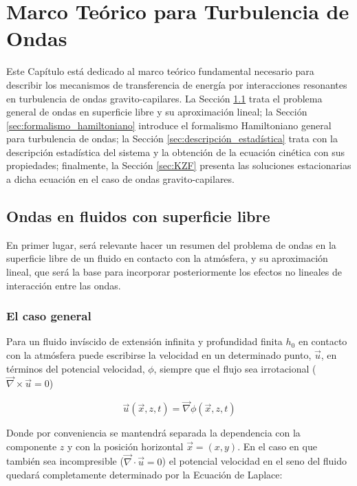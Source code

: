 \chapter{Marco Teórico para Turbulencia de Ondas} 
Este Capítulo está dedicado al marco teórico fundamental necesario para describir los mecanismos de transferencia de energía por interacciones resonantes en turbulencia de ondas gravito-capilares. La Sección \ref{sec:ondas_fluidos} trata el problema general de ondas en superficie libre y su aproximación lineal; la Sección \ref{sec:formalismo_hamiltoniano} introduce el formalismo Hamiltoniano general para turbulencia de ondas; la Sección \ref{sec:descripción_estadística} trata con la descripción estadística del sistema y la obtención de la ecuación cinética con sus propiedades; finalmente, la Sección \ref{sec:KZF} presenta las soluciones estacionarias a dicha ecuación en el caso de ondas gravito-capilares. 


\clearpage 
\section{Ondas en fluidos con superficie libre} 
\label{sec:ondas_fluidos} 
En primer lugar, será relevante hacer un resumen del problema de ondas en la superficie libre de un fluido en contacto con la atmósfera, y su aproximación lineal, que será la base para incorporar posteriormente los efectos no lineales de interacción entre las ondas.  

\subsection{El caso general} %
Para un fluido invíscido de extensión infinita y profundidad finita $h_0$ en contacto con la atmósfera puede escribirse la velocidad en un determinado punto, $\vec u$, en términos del potencial velocidad, $\phi$, siempre que el flujo sea irrotacional ($\vec\nabla\times\vec u=0$) 

\begin{equation}
	\vec u(\vec x, z, t) = \vec \nabla\phi(\vec x, z, t) 
\end{equation} 

Donde por conveniencia se mantendrá separada la dependencia con la componente $z$ y con la posición horizontal $\vec x=(x, y)$. En el caso en que también sea incompresible ($\vec \nabla\cdot\vec u=0$) el potencial velocidad en el seno del fluido quedará completamente determinado por la Ecuación de Laplace: %

